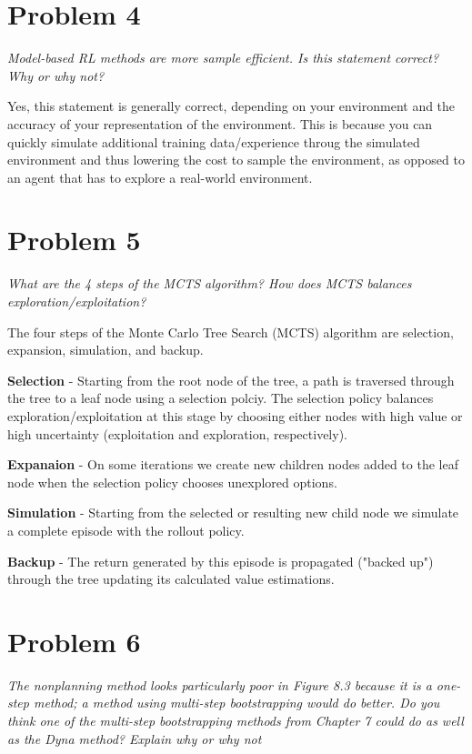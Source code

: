 \documentclass{article}
\begin{document}
\section*{Problem 4}

\textit{Model-based RL methods are more sample efficient. Is this statement correct? Why or why not?}

Yes, this statement is generally correct, depending on your environment and the accuracy of your representation of the environment. This is because you can quickly simulate additional training data/experience throug the simulated environment and thus lowering the cost to sample the environment, as opposed to an agent that has to explore a real-world environment.

\section*{Problem 5}

\textit{What are the 4 steps of the MCTS algorithm? How does MCTS balances exploration/exploitation?}

The four steps of the Monte Carlo Tree Search (MCTS) algorithm are selection, expansion, simulation, and backup.

\textbf{Selection} - Starting from the root node of the tree, a path is traversed through the tree to a leaf node using a selection polciy. The selection policy balances exploration/exploitation at this stage by choosing either nodes with high value or high uncertainty (exploitation and exploration, respectively).

\textbf{Expanaion} - On some iterations we create new children nodes added to the leaf node when the selection policy chooses unexplored options.

\textbf{Simulation} - Starting from the selected or resulting new child node we simulate a complete episode with the rollout policy.

\textbf{Backup} - The return generated by this episode is propagated ("backed up") through the tree updating its calculated value estimations.

\section*{Problem 6}

\textit{The nonplanning method looks particularly poor in Figure 8.3 because it is a one-step method; a method using multi-step bootstrapping would do better. Do you think one of the multi-step bootstrapping methods from Chapter 7 could do as well as the Dyna method? Explain why or why not}
\end{document}
